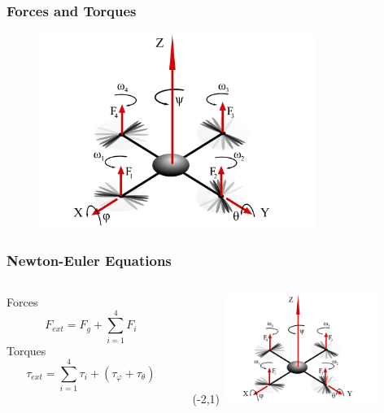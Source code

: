

\begin{frame}
		\frametitle{Forces and Torques}
		\begin{figure}[p]
			\centering
			\includegraphics[width=0.8\textwidth]{images/Kraefte.pdf}
			\label{fig:Kraefte}
		\end{figure}
	\end{frame}

	\begin{frame}
		\frametitle{Newton-Euler Equations}
			\begin{columns}[T] %
				\begin{column}{0.70\textwidth}
					Forces \\
					\[ F_{ext} = F_{g} + \sum_{i=1}^{4}{F_{i}} \]
					Torques \\
					\[ \tau_{ext} = \sum_{i=1}^{4}{\tau_{i}}+(\tau_{\varphi}+\tau_{\theta}) \]
				\end{column}
			\hfill
			\begin{column}{.25\textwidth}
				\begin{textblock}{0}(-2,1)
					\includegraphics[width=5cm]{images/Kraefte.pdf}
					\label{fig:Kraefte klein}
				\end{textblock}
			\end{column}
		\end{columns}
	\end{frame}
		
